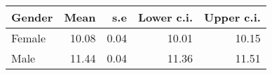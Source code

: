 \begin{tabular}{lrrrr}
  \hline
Gender & Mean & s.e & Lower c.i. & Upper c.i. \\ 
  \hline
Female & 10.08 & 0.04 & 10.01 & 10.15 \\ 
  Male & 11.44 & 0.04 & 11.36 & 11.51 \\ 
   \hline
\end{tabular}
